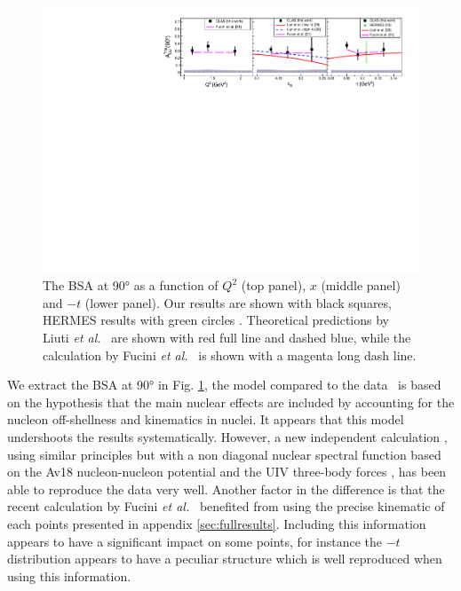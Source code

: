 \documentclass{article}
\begin{document}
\begin{figure}[tbp]
\center
\includegraphics[width=17cm]{fig3/Coherent_ALU_phi_90.pdf}
\caption{The BSA at 90° as a function of $Q^2$ (top panel), $x$ (middle panel) and $-t$ (lower panel).
	Our results are shown with black squares, HERMES results 
	with green circles \cite{Airapetian:2009cga}. Theoretical predictions 
	by Liuti {\it et al.}~\cite{Liuti:2005gi,GonzalezHernandez:2012jv} are shown 
	with red full line and dashed blue, while the calculation by Fucini 
	{\it et al.}~\cite{Fucini:2018gso} is shown with a magenta long dash line.}
\label{fig:CohALU90}
\end{figure}

We extract the BSA at 90° in Fig. \ref{fig:CohALU90}, the model compared to the 
data~\cite{Liuti:2005gi} is based on the hypothesis that the main nuclear effects are 
included by accounting for the nucleon off-shellness and kinematics in nuclei. It 
appears that this model undershoots the results systematically. However, a new independent 
calculation \cite{Fucini:2018gso}, using similar principles but with a non diagonal nuclear spectral 
function \cite{Viviani:2001wu} based on the Av18 nucleon-nucleon potential \cite{Wiringa:1994wb} 
and the UIV three-body forces \cite{Pudliner:1995wk}, has been able to reproduce the data very 
well. Another factor in the difference is that the recent calculation by Fucini {\it et 
al.}~\cite{Fucini:2018gso} benefited from using the precise kinematic of each points presented 
in appendix \ref{sec:fullresults}. Including this information appears to have a significant 
impact on some points, for instance the $-t$ distribution appears to have a peculiar structure 
which is well reproduced when using this information. 
\end{document}
